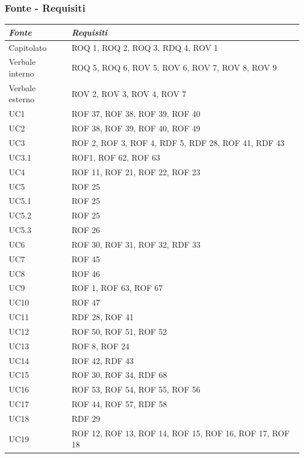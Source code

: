 \documentclass[12pt, oneside]{article}
\begin{document}
\subsubsection{Fonte - Requisiti}
\begin{longtable}{|p{4cm}|p{12cm}|}
    \hline
    \emph{Fonte} & \emph{Requisiti}\\
    \hline
    \endfirsthead
    \endhead
    Capitolato & ROQ 1, ROQ 2, ROQ 3, RDQ 4, ROV 1 \\
    \hline
    Verbale interno & ROQ 5, ROQ 6, ROV 5, ROV 6, ROV 7, ROV 8, ROV 9 \\
    \hline
    Verbale esterno & ROV 2, ROV 3, ROV 4, ROV 7 \\
    \hline
    UC1 & ROF 37, ROF 38, ROF 39, ROF 40 \\
    \hline
    UC2 & ROF 38, ROF 39, ROF 40, ROF 49  \\
    \hline
    UC3 & ROF 2, ROF 3, ROF 4, RDF 5, RDF 28, ROF 41, RDF 43 \\
    \hline 
    UC3.1 & ROF1, ROF 62, ROF 63 \\
    \hline
    UC4 & ROF 11, ROF 21, ROF 22, ROF 23 \\
    \hline
    UC5 & ROF 25 \\
    \hline
    UC5.1 & ROF 25 \\
    \hline
    UC5.2 & ROF 25 \\
    \hline
    UC5.3 & ROF 26 \\
    \hline
    UC6 & ROF 30, ROF 31, ROF 32, RDF 33 \\
    \hline
    UC7 & ROF 45  \\
    \hline
    UC8 & ROF 46 \\
    \hline
    UC9 & ROF 1, ROF 63, ROF 67 \\
    \hline
    UC10 & ROF 47 \\
    \hline
    UC11 & RDF 28, ROF 41 \\
    \hline
    UC12 & ROF 50, ROF 51, ROF 52 \\
    \hline
    UC13 & ROF 8, ROF 24 \\
    \hline
    UC14 & ROF 42, RDF 43 \\
    \hline
    UC15 & ROF 30, ROF 34, RDF 68 \\
    \hline
    UC16 & ROF 53, ROF 54, ROF 55, ROF 56 \\
    \hline
    UC17 & ROF 44, ROF 57, RDF 58 \\
    \hline
    UC18 & RDF 29 \\
    \hline
    UC19 & ROF 12, ROF 13, ROF 14, ROF 15, ROF 16, ROF 17, ROF 18 \\

\end{longtable}
\end{document}
